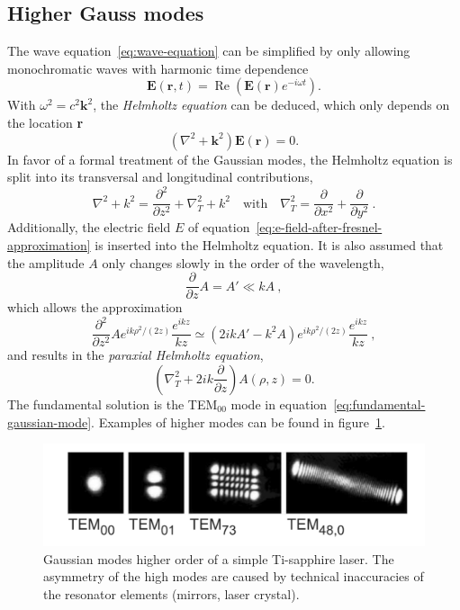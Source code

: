 \subsection{Higher Gauss modes}
The wave equation~\eqref{eq:wave-equation} can be simplified by only allowing monochromatic waves with harmonic time dependence
\begin{equation}
\mathbf{E}(\mathbf{r},t) = \operatorname{Re}\left(\mathbf{E}(\mathbf{r})e^{-i\omega t}\right).
\end{equation}
With $\omega^2=c^2\mathbf{k}^2$, the \textit{Helmholtz equation} can be deduced, which only depends on the location \textbf{r}
\begin{equation}
\left(\nabla^2+\mathbf{k}^2\right)\mathbf{E}(\mathbf{r})=0.
\end{equation}
In favor of a formal treatment of the Gaussian modes, the Helmholtz equation is split into its transversal and longitudinal contributions,
\begin{equation}
\nabla^2+k^2=\frac{\partial^2}{\partial z^2} + \nabla_T^2+k^2
\quad\mathrm{with}\quad
\nabla_T^2=\frac{\partial}{\partial x^2}+\frac{\partial}{\partial y^2} \ .
\end{equation}
Additionally, the electric field $E$ of equation~\eqref{eq:e-field-after-fresnel-approximation} is inserted into the Helmholtz equation.
It is also assumed that the amplitude $A$ only changes slowly in the order of the wavelength,
\begin{equation}
\frac{\partial}{\partial z} A = A' \ll kA \ ,
\end{equation}
which allows the approximation
\begin{equation}
\frac{\partial^2}{\partial z^2} A e^{ik\rho^2 /(2z)} \frac{e^{ikz}}{kz} \simeq (2ikA'-k^2A)e^{ik\rho^2/(2z)}\frac{e^{ikz}}{kz} \ ,
\end{equation}
and results in the \textit{paraxial Helmholtz equation},
\begin{equation}
\left(\nabla_T^2+2ik\frac{\partial}{\partial z}\right)A(\rho, z) = 0.
\end{equation}
The fundamental solution is the TEM$_{00}$ mode in equation~\eqref{eq:fundamental-gaussian-mode}. Examples of higher modes can be found in figure~\ref{fig:gauss-modes-higher-order}.
\begin{figure}[H]
	\centering
	\includegraphics[width=0.9\linewidth]{figures/fabry-perot/gauss-modes-higher-order}
	\caption[Gaussian modes higher order of a simple Ti-sapphire laser]{Gaussian modes higher order of a simple Ti-sapphire laser.
		The asymmetry of the high modes are caused by technical inaccuracies of the resonator elements (mirrors, laser crystal).}
	\label{fig:gauss-modes-higher-order}
\end{figure}



